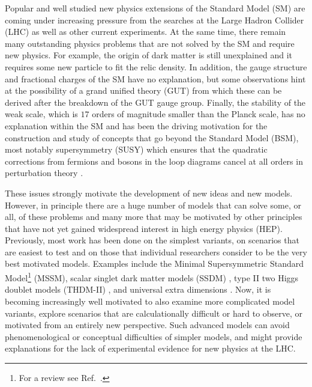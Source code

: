 \documentclass[final,3p,11pt,pdflatex]{elsarticle}
\begin{document}
Popular and well studied new physics extensions of the Standard Model
(SM) are coming under increasing pressure from the searches at the
Large Hadron Collider (LHC) as well as other current experiments.  At
the same time, there remain many outstanding physics problems that are
not solved by the SM and require new physics.  For example, the origin
of dark matter is still unexplained and it requires some new particle
to fit the relic density.  In addition, the gauge structure and
fractional charges of the SM have no explanation, but some
observations hint at the possibility of a grand unified theory (GUT)
from which these can be derived after the breakdown of the GUT gauge
group.  Finally, the stability of the weak scale, which is $17$ orders
of magnitude smaller than the Planck scale, has no explanation within
the SM \cite{Weinberg:1975gm, Weinberg:1979bn,
  Gildener:1976ai,Susskind:1978ms, tHooft:1980xss} and has been the
driving motivation for the construction and study of concepts that go
beyond the Standard Model (BSM), most notably supersymmetry (SUSY) \cite{Miyazawa:1966mfa,Miyazawa:1968zz,Ramond:1971gb,Golfand:1971iw,Gervais:1971ji,Neveu:1971rx,Neveu:1971iv,Volkov:1973ix,Wess:1973kz,Wess:1974tw,Salam:1974yz} which ensures that the quadratic corrections from fermions and bosons in the loop diagrams cancel at all orders in perturbation theory \cite{Dimopoulos:1981au,Witten:1981nf,Dine:1981za,Dimopoulos:1981zb,Kaul:1981hi}.

These issues strongly motivate the development of new ideas and new
models.  However, in principle there are a huge number of models that
can solve some, or all, of these problems and many more that may be
motivated by other principles that have not yet gained widespread
interest in high energy physics (HEP)\@. Previously, most work has
been done on the simplest variants, on scenarios that are easiest to
test and on those that individual researchers consider to be the very
best motivated models. Examples include the Minimal Supersymmetric
Standard Model\footnote{For a review see Ref.\ \cite{Chung:2003fi}.}
(MSSM), scalar singlet dark matter models (SSDM)
\cite{Silveira:1985rk,McDonald:1993ex,Burgess:2000yq}, type II two
Higgs doublet models (THDM-II) \cite{Lee:1973iz,Glashow:1976nt,
  Donoghue:1978cj}, and universal extra dimensions
\cite{Appelquist:2000nn}.  Now, it is becoming increasingly well
motivated to also examine more complicated model variants, explore
scenarios that are calculationally difficult or hard to observe, or
motivated from an entirely new perspective.  Such advanced models can
avoid phenomenological or conceptual difficulties of simpler models,
and might provide explanations for the lack of experimental evidence
for new physics at the LHC.
\end{document}
